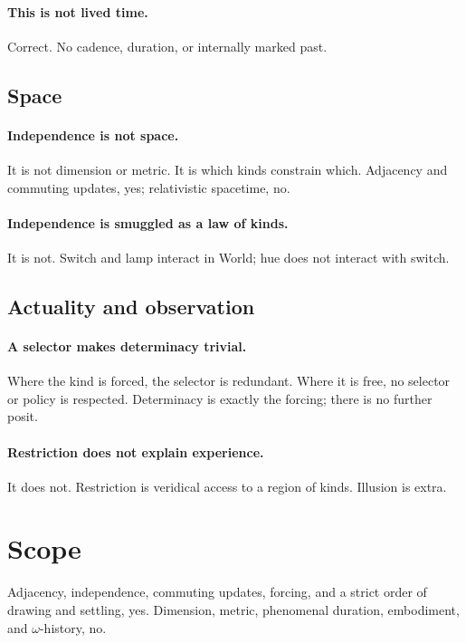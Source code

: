 \documentclass[11pt]{article}
\theoremstyle{definition}
\begin{document}
\paragraph{This is not lived time.}
Correct. No cadence, duration, or internally marked past.

\subsection{Space}

\paragraph{Independence is not space.}
It is not dimension or metric. It is which kinds constrain which.
Adjacency and commuting updates, yes; relativistic spacetime, no.

\paragraph{Independence is smuggled as a law of kinds.}
It is not. Switch and lamp interact in World; hue does not interact
with switch.

\subsection{Actuality and observation}

\paragraph{A selector makes determinacy trivial.}
Where the kind is forced, the selector is redundant. Where it is
free, no selector or policy is respected. Determinacy is exactly the
forcing; there is no further posit.

\paragraph{Restriction does not explain experience.}
It does not. Restriction is veridical access to a region of kinds.
Illusion is extra.

\section{Scope}

Adjacency, independence, commuting updates, forcing, and a strict
order of drawing and settling, yes. Dimension, metric, phenomenal
duration, embodiment, and $\omega$-history, no.
\end{document}
